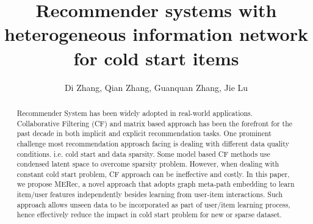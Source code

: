 \documentclass{ws-procs9x6}            %
\begin{document}
\title{Recommender systems with heterogeneous information network for cold start items}

\author{Di Zhang, Qian Zhang, Guanquan Zhang, Jie Lu}

\address{\textit{Decision Systems and e-Service Intelligence Laboratory,} \\
\textit{Centre for Artificial Intelligence}\\
University of Technology Sydney, Australia \\
Di.Zhang-7@student.uts.edu.au, Qian.Zhang-1@uts.edu.au \\
Guangquan.Zhang@uts.edu.au, Jie.Lu@uts.edu.au}

\begin{abstract}
Recommender System has been widely adopted in real-world applications. Collaborative Filtering (CF) and matrix based approach has been the forefront for the past decade in both implicit and explicit recommendation tasks. One prominent challenge most recommendation approach facing is dealing with different data quality conditions. i.e. cold start and data sparsity. Some model based CF methods use condensed latent space to overcome sparsity problem. However, when dealing with constant cold start problem, CF approach can be ineffective and costly. In this paper, we propose MERec, a novel approach that adopts graph meta-path embedding to learn item/user features independently besides learning from user-item interactions. Such approach allows unseen data to be incorporated as part of user/item learning process, hence effectively reduce the impact in cold start problem for new or sparse dataset.
\end{abstract}


\bodymatter
















\end{document}
